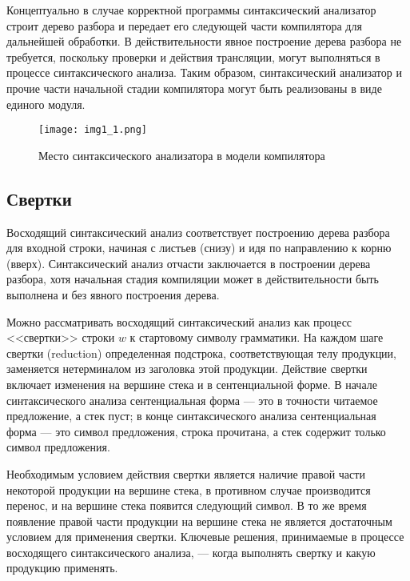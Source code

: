 \documentclass[bachelor, och, coursework, times]{SCWorks}
\begin{document}
Концептуально в случае корректной программы синтаксический анализатор строит дерево разбора и передает его следующей части компилятора для дальнейшей обработки. В действительности явное построение дерева разбора не требуется, поскольку проверки и действия трансляции, могут выполняться в процессе синтаксического анализа. Таким образом, синтаксический анализатор и прочие части начальной стадии компилятора могут быть реализованы в виде единого модуля.~\cite{Kluch}

\begin{figure} [!ht]
	\centering
	\texttt{[image: img1\_1.png]}
	\caption{Место синтаксического анализатора в модели компилятора}
	\label{ris:image1}
\end{figure}






\subsection{Свертки}

Восходящий синтаксический анализ соответствует построению дерева  разбора для входной строки, начиная с листьев (снизу) и идя по направлению к корню (вверх). Синтаксический анализ отчасти заключается в построении дерева разбора, хотя начальная стадия компиляции может в действительности быть  выполнена и без явного построения дерева.

Можно рассматривать восходящий синтаксический анализ как процесс  <<свертки>> строки $w$ к стартовому символу грамматики. На каждом шаге свертки (reduction) определенная подстрока, соответствующая телу продукции, заменяется нетерминалом из заголовка этой продукции. Действие свертки включает изменения на вершине стека и в сентенциальной форме. В начале синтаксического анализа сентенциальная форма --- это в точности читаемое предложение, а стек пуст; в конце синтаксического анализа сентенциальная форма --- это символ предложения, строка прочитана, а стек содержит только символ предложения.~\cite{Karpov}

Необходимым условием действия свертки является наличие правой части некоторой продукции на вершине стека, в противном случае производится перенос, и на вершине стека появится следующий символ. В то же время появление правой части продукции на вершине стека не является достаточным условием для применения свертки. Ключевые решения, принимаемые в процессе восходящего синтаксического анализа, --- когда выполнять свертку и какую продукцию применять.
\end{document}
